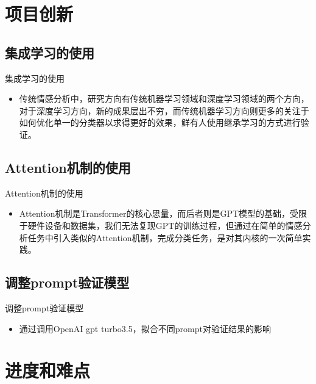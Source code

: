 \documentclass[UTF8]{ctexbeamer}
\begin{document}
\section{项目创新}

\subsection{集成学习的使用}
\begin{frame}{集成学习的使用}
  \begin{itemize}
  \item {
    传统情感分析中，研究方向有传统机器学习领域和深度学习领域的两个方向，对于深度学习方向，新的成果层出不穷，而传统机器学习方向则更多的关注于如何优化单一的分类器以求得更好的效果，鲜有人使用继承学习的方式进行验证。
  }
    \end{itemize}
\end{frame}

\subsection{Attention机制的使用}
\begin{frame}{Attention机制的使用}
   \begin{itemize}
 \item {
    Attention机制是Transformer的核心思量，而后者则是GPT模型的基础，受限于硬件设备和数据集，我们无法复现GPT的训练过程，但通过在简单的情感分析任务中引入类似的Attention机制，完成分类任务，是对其内核的一次简单实践。
  }
  \end{itemize}
\end{frame}
  
\subsection{调整prompt验证模型}

\begin{frame}{调整prompt验证模型}
   \begin{itemize}
 \item {
    通过调用OpenAI gpt turbo3.5，拟合不同prompt对验证结果的影响
  }
  \end{itemize}
\end{frame}



\section{进度和难点}
\end{document}
